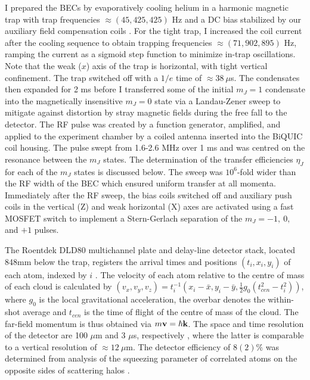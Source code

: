 	I prepared the BECs by evaporatively cooling helium in a harmonic magnetic trap with trap frequencies $\approx(45,425,425)$ Hz and a DC bias stabilized by our auxiliary field compensation coils \cite{Dall07,Dedman07}. For the tight trap, I increased the coil current after the cooling sequence to obtain trapping frequencies $\approx(71,902,895)$ Hz, ramping the current as a sigmoid step function to minimize in-trap oscillations. Note that the weak ($x$) axis of the trap is horizontal, with tight vertical confinement. The trap switched off with a $1/e$ time of $\approx38~\mu$s. The condensates then expanded for 2 ms before I transferred some of the initial $m_J=1$ condensate into the magnetically insensitive $m_J=0$ state via a Landau-Zener sweep to mitigate against distortion by stray magnetic fields during the free fall to the detector. The RF pulse was created by a function generator, amplified, and applied to the experiment chamber by a coiled antenna inserted into the BiQUIC coil housing. The pulse swept from 1.6-2.6 MHz over 1 ms and was centred on the resonance between the $m_J$ states. The determination of the transfer efficiencies $\eta_J$ for each of the $m_J$ states is discussed below. The sweep was $10^6$-fold wider than the RF width of the BEC which ensured uniform transfer at all momenta. Immediately after the RF sweep, the bias coils switched off and auxiliary push coils in the vertical (Z) and weak horizontal (X) axes are activated using a fast MOSFET switch to implement a Stern-Gerlach separation of the $m_J = -1,~0,$ and $+1$ pulses.

	The Roentdek DLD80 multichannel plate and delay-line detector stack, located 848mm below the trap, registers the arrival times and positions $(t_i,x_i,y_i)$ of each atom, indexed by $i$ \cite{Manning10}. 
	The velocity of each atom relative to the centre of mass of each cloud is calculated by $(v_x,v_y,v_z) = t_{i}^{-1}(x_i-\bar{x},y_i-\bar{y},\tfrac{1}{2}g_0(t_{cen}^2-t_{i}^{2}))$, where $g_0$ is the local gravitational acceleration, the overbar denotes the within-shot average and $t_{cen}$ is the time of flight of the centre of mass of the cloud. 
	The far-field momentum is thus obtained via $m\textbf{v} = \hbar\textbf{k}$.
	The space and time resolution of the detector are 100 $\mu$m and 3 $\mu$s, respectively \cite{Henson18_BCR}, where the latter is comparable to a vertical resolution of $\approx 12~\mu$m.
	The detector efficiency of $8(2)\%$ was determined from analysis of the squeezing parameter of correlated atoms on the opposite sides of scattering halos \cite{Shin19,Shin20,Jaskula10}. 


